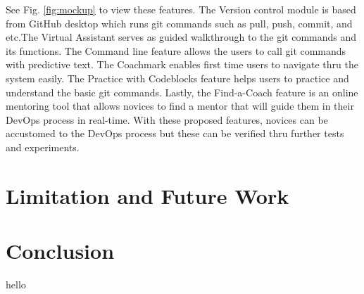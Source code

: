 \documentclass{sigchi}
\begin{document}
See Fig. \ref{fig:mockup} to view these features. The Version control module is based from GitHub desktop which runs git commands such as pull, push, commit, and etc.The Virtual Assistant serves as guided walkthrough to the git commands and its functions. The Command line feature allows the users to call git commands with predictive text. The Coachmark enables first time users to navigate thru the system easily. The Practice with Codeblocks feature helps users to practice and understand the basic git commands. Lastly, the Find-a-Coach feature is an online mentoring tool that allows novices to find a mentor that will guide them in their DevOps process in real-time. With these proposed features, novices can be accustomed to the DevOps process but these can be verified thru further tests and experiments. 







\section{Limitation and Future Work}



\section{Conclusion}
hello





%



\balance{}



\end{document}
